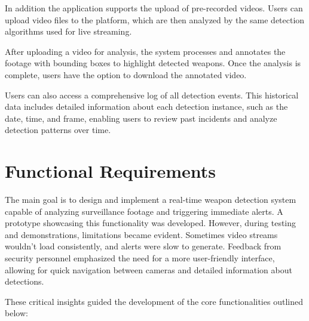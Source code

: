 In addition the application supports the upload of pre-recorded videos. Users can upload video files to the platform, which 
are then analyzed by the same detection algorithms used for live streaming.

After uploading a video for analysis, the system processes and annotates the footage with bounding boxes to 
highlight detected weapons. Once the analysis is complete, users have the option to download the annotated video.

Users can also access a comprehensive log of all detection events. This historical data includes detailed information 
about each detection instance, such as the date, time, and frame, enabling users to review past incidents and 
analyze detection patterns over time.

\section{Functional Requirements}
The main goal is to design and implement a real-time weapon detection system capable of 
analyzing surveillance footage and triggering immediate alerts. A prototype showcasing this functionality was developed. 
However, during testing and demonstrations, limitations became evident. Sometimes video streams wouldn't load consistently, 
and alerts were slow to generate. Feedback from security personnel emphasized the need for a more user-friendly 
interface, allowing for quick navigation between cameras and detailed information about detections.

These critical insights guided the development of the core functionalities outlined below:

